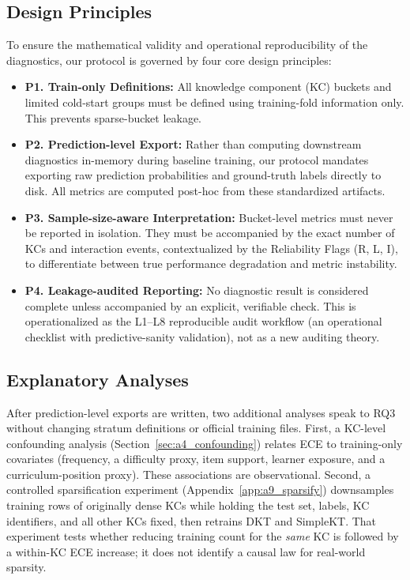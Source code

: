 \subsection{Design Principles}
\label{sec:principles}
To ensure the mathematical validity and operational reproducibility of the diagnostics, our protocol is governed by four core design principles:
\begin{itemize}
    \item \textbf{P1. Train-only Definitions:} All knowledge component (KC) buckets and limited cold-start groups must be defined using training-fold information only. This prevents sparse-bucket leakage.
    \item \textbf{P2. Prediction-level Export:} Rather than computing downstream diagnostics in-memory during baseline training, our protocol mandates exporting raw prediction probabilities and ground-truth labels directly to disk. All metrics are computed post-hoc from these standardized artifacts.
    \item \textbf{P3. Sample-size-aware Interpretation:} Bucket-level metrics must never be reported in isolation. They must be accompanied by the exact number of KCs and interaction events, contextualized by the Reliability Flags (R, L, I), to differentiate between true performance degradation and metric instability.
    \item \textbf{P4. Leakage-audited Reporting:} No diagnostic result is considered complete unless accompanied by an explicit, verifiable check. This is operationalized as the L1--L8 reproducible audit workflow (an operational checklist with predictive-sanity validation), not as a new auditing theory.
\end{itemize}

\subsection{Explanatory Analyses}
After prediction-level exports are written, two additional analyses speak to RQ3 without changing stratum definitions or official training files. First, a KC-level confounding analysis (Section~\ref{sec:a4_confounding}) relates ECE to training-only covariates (frequency, a difficulty proxy, item support, learner exposure, and a curriculum-position proxy). These associations are observational. Second, a controlled sparsification experiment (Appendix~\ref{app:a9_sparsify}) downsamples training rows of originally dense KCs while holding the test set, labels, KC identifiers, and all other KCs fixed, then retrains DKT and SimpleKT. That experiment tests whether reducing training count for the \emph{same} KC is followed by a within-KC ECE increase; it does not identify a causal law for real-world sparsity.
